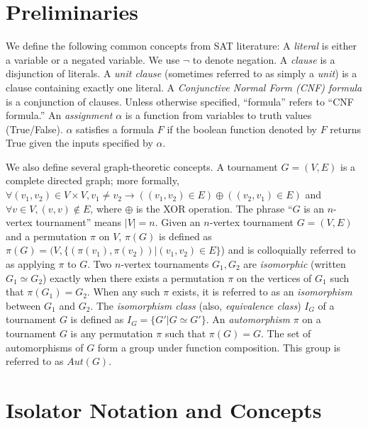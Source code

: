 \documentclass[conference]{IEEEtran}
\begin{document}
\section{Preliminaries}

We define the following common concepts from SAT literature:
A \emph{literal} is either a variable or a negated variable. We use $\lnot$ to denote negation.
A \emph{clause} is a disjunction of literals.
A \emph{unit clause} (sometimes referred to as simply a \emph{unit}) is a clause containing exactly one literal.
A \emph{Conjunctive Normal Form (CNF) formula} is a conjunction of clauses. Unless otherwise specified, ``formula'' refers to ``CNF formula.''
An \emph{assignment} $\alpha$ is a function from variables to truth values (True/False). $\alpha$ satisfies a formula $F$ if the boolean function denoted by $F$ returns True given the inputs specified by $\alpha$.


We also define several graph-theoretic concepts.
A tournament $G = (V,E)$ is a complete directed graph; more formally, $\forall (v_1, v_2) \in V \times V, v_1 \neq v_2 \rightarrow ((v_1, v_2) \in E) \oplus ((v_2, v_1) \in E)$ and $\forall v \in V, (v,v) \notin E$, where $\oplus$ is the XOR operation. The phrase ``$G$ is an $n$-vertex tournament'' means $|V| = n$.
Given an $n$-vertex tournament $G= (V,E)$ and a permutation $\pi$ on $V$, $\pi(G)$ is defined as $\pi(G) = (V, \{(\pi(v_1), \pi(v_2)) | (v_1, v_2) \in E\}$) and is colloquially referred to as applying $\pi$ to $G$.
Two $n$-vertex tournaments $G_1, G_2$ are \emph{isomorphic} (written $G_1 \simeq G_2$) exactly when there exists a permutation $\pi$ on the vertices of $G_1$ such that $\pi(G_1) = G_2$. When any such $\pi$ exists, it is referred to as an \emph{isomorphism} between $G_1$ and $G_2$.
The \emph{isomorphism class} (also, \emph{equivalence class}) $I_G$ of a tournament $G$ is defined as $I_G = \{G' | G \simeq G'\}$.
An \emph{automorphism} $\pi$ on a tournament $G$ is any permutation $\pi$ such that $\pi(G) = G$. The set of automorphisms of $G$ form a group under function composition. This group is referred to as $Aut(G)$.

\section{Isolator Notation and Concepts}
\end{document}
